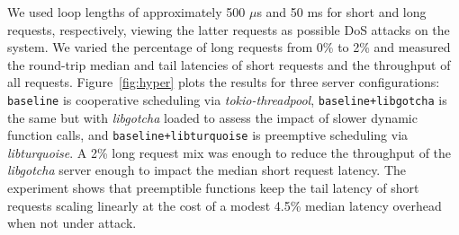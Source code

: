 We used loop lengths of approximately 500 $\mu$s and 50 ms for short and long requests,
respectively, viewing the latter requests as possible DoS attacks on the system.
We varied the percentage of long requests from 0\% to 2\% and measured the round-trip
median and tail latencies of short requests and the throughput of all requests.
Figure~\ref{fig:hyper} plots the results for three server configurations:\@
\texttt{baseline} is cooperative scheduling via \textit{tokio-threadpool},
\texttt{baseline+libgotcha} is the same but with \textit{libgotcha} loaded to assess
the
impact of slower dynamic function calls, and \texttt{baseline+libturquoise} is
preemptive
scheduling via \textit{libturquoise}.  A 2\% long request mix was enough to reduce
the throughput of the \textit{libgotcha} server enough to impact the
median short request latency.
The experiment shows that preemptible
functions keep the tail latency of short requests scaling linearly at the cost
of a
modest 4.5\% median latency overhead when not under attack.

